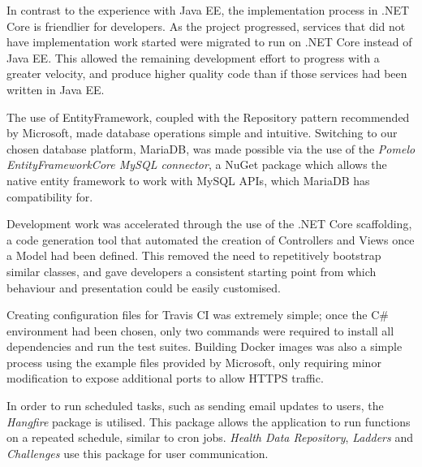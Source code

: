 In contrast to the experience with Java EE, the implementation process in .NET Core is friendlier for developers. As the project progressed, services that did not have implementation work started were migrated to run on .NET Core instead of Java EE. This allowed the remaining development effort to progress with a greater velocity, and produce higher quality code than if those services had been written in Java EE.

The use of EntityFramework, coupled with the Repository pattern\cite{dotnet_repository_pattern} recommended by Microsoft, made database operations simple and intuitive. Switching to our chosen database platform, MariaDB, was made possible via the use of the \textit{Pomelo EntityFrameworkCore MySQL connector}\cite{Pomelo}, a NuGet package which allows the native entity framework to work with MySQL APIs, which MariaDB has compatibility for.

Development work was accelerated through the use of the .NET Core scaffolding, a code generation tool that automated the creation of Controllers and Views once a Model had been defined. This removed the need to repetitively bootstrap similar classes, and gave developers a consistent starting point from which behaviour and presentation could be easily customised.

Creating configuration files for Travis CI was extremely simple; once the C\# environment had been chosen, only two commands were required to install all dependencies and run the test suites. Building Docker images was also a simple process using the example files provided by Microsoft\cite{dotnet_docker}, only requiring minor modification to expose additional ports to allow HTTPS traffic.

In order to run scheduled tasks, such as sending email updates to users, the \textit{Hangfire}\cite{hangfire} package is utilised. This package allows the application to run functions on a repeated schedule, similar to cron jobs. \textit{Health Data Repository}, \textit{Ladders} and \textit{Challenges} use this package for user communication.
